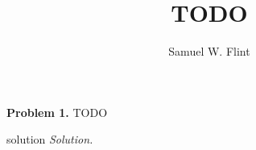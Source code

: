 \documentclass[paper=letter,twoside,fontsize=10pt,parskip=half,mpinclude=true]{scrartcl}
\title{TODO}
\subtitle{\course}
\author{Samuel W. Flint}
\date{\term}
\begin{document}
\maketitle

\textbf{Problem 1.}
TODO

\begin{taggedblock}{solution}
  \textit{Solution.}
\end{taggedblock}

\printbibliography
\end{document}
